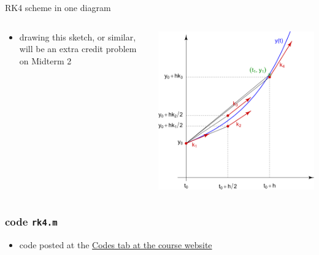 \documentclass[urlcolor=blue,dvipsnames]{beamer}
\begin{document}
\begin{frame}{RK4 scheme in one diagram}

\begin{columns}
\begin{column}{0.35\textwidth}
\small
\begin{itemize}
\item drawing this sketch, or similar, will be an extra credit problem on Midterm 2
\end{itemize}
\end{column}
\begin{column}{0.65\textwidth}
\hfill \includegraphics[width=\textwidth]{figs/rk4diagram}
\end{column}
\end{columns}
\end{frame}


\begin{frame}[fragile]
\frametitle{code \texttt{rk4.m}}

\begin{itemize}
\item code posted at the \href{https://bueler.github.io/math302/codes.html}{Codes tab at the course website}
\end{itemize}

\medskip
{}
\end{frame}
\end{document}
